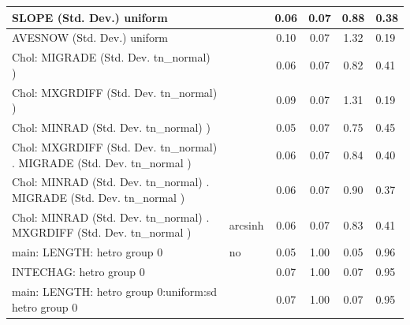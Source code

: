 \begin{table}
\begin{center}
\begin{tabular}{|l|l|c|c|c|l|}
			\hline
			SLOPE (Std. Dev.) uniform &  & 0.06 & 0.07 & 0.88 & 0.38 \\
			\hline
			AVESNOW (Std. Dev.) uniform &  & 0.10 & 0.07 & 1.32 & 0.19 \\
			\hline
			 Chol: MIGRADE (Std. Dev. tn_normal) ) &  & 0.06 & 0.07 & 0.82 & 0.41 \\
			\hline
			 Chol: MXGRDIFF (Std. Dev. tn_normal) ) &  & 0.09 & 0.07 & 1.31 & 0.19 \\
			\hline
			 Chol: MINRAD (Std. Dev. tn_normal) ) &  & 0.05 & 0.07 & 0.75 & 0.45 \\
			\hline
			 Chol: MXGRDIFF (Std. Dev. tn_normal) . MIGRADE (Std. Dev.   tn_normal ) &  & 0.06 & 0.07 & 0.84 & 0.40 \\
			\hline
			 Chol: MINRAD (Std. Dev. tn_normal) . MIGRADE (Std. Dev.   tn_normal ) &  & 0.06 & 0.07 & 0.90 & 0.37 \\
			\hline
			 Chol: MINRAD (Std. Dev. tn_normal) . MXGRDIFF (Std. Dev.   tn_normal ) & arcsinh & 0.06 & 0.07 & 0.83 & 0.41 \\
			\hline
			main: LENGTH: hetro group 0 & no & 0.05 & 1.00 & 0.05 & 0.96 \\
			\hline
			INTECHAG: hetro group 0 &  & 0.07 & 1.00 & 0.07 & 0.95 \\
			\hline
			main: LENGTH: hetro group 0:uniform:sd  hetro group 0 &  & 0.07 & 1.00 & 0.07 & 0.95 \\
			\hline
		\end{tabular}
	\end{center}
\end{table}